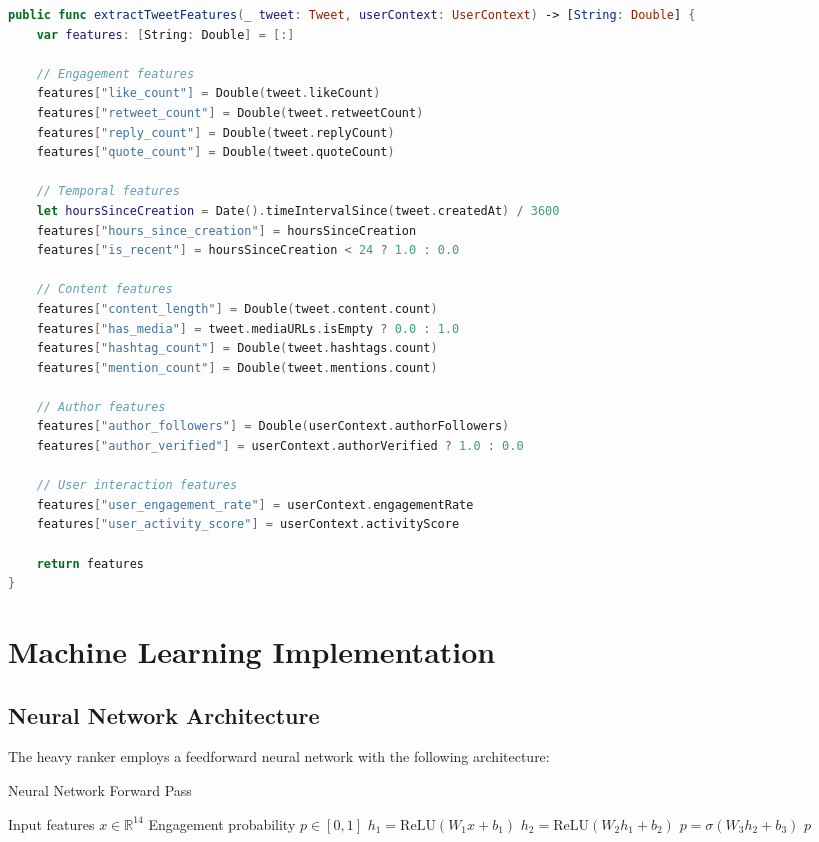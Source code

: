 \documentclass[11pt,a4paper]{article}
\begin{document}
\begin{lstlisting}[language=Swift, caption=Feature Extraction Implementation]
public func extractTweetFeatures(_ tweet: Tweet, userContext: UserContext) -> [String: Double] {
    var features: [String: Double] = [:]
    
    // Engagement features
    features["like_count"] = Double(tweet.likeCount)
    features["retweet_count"] = Double(tweet.retweetCount)
    features["reply_count"] = Double(tweet.replyCount)
    features["quote_count"] = Double(tweet.quoteCount)
    
    // Temporal features
    let hoursSinceCreation = Date().timeIntervalSince(tweet.createdAt) / 3600
    features["hours_since_creation"] = hoursSinceCreation
    features["is_recent"] = hoursSinceCreation < 24 ? 1.0 : 0.0
    
    // Content features
    features["content_length"] = Double(tweet.content.count)
    features["has_media"] = tweet.mediaURLs.isEmpty ? 0.0 : 1.0
    features["hashtag_count"] = Double(tweet.hashtags.count)
    features["mention_count"] = Double(tweet.mentions.count)
    
    // Author features
    features["author_followers"] = Double(userContext.authorFollowers)
    features["author_verified"] = userContext.authorVerified ? 1.0 : 0.0
    
    // User interaction features
    features["user_engagement_rate"] = userContext.engagementRate
    features["user_activity_score"] = userContext.activityScore
    
    return features
}
\end{lstlisting}

\section{Machine Learning Implementation}

\subsection{Neural Network Architecture}

The heavy ranker employs a feedforward neural network with the following architecture:

\begin{algorithm}[H]
\caption{Neural Network Forward Pass}
\begin{algorithmic}[1]
\REQUIRE Input features $x \in \mathbb{R}^{14}$
\ENSURE Engagement probability $p \in [0,1]$
\STATE $h_1 = \text{ReLU}(W_1 x + b_1)$ 
\STATE $h_2 = \text{ReLU}(W_2 h_1 + b_2)$ 
\STATE $p = \sigma(W_3 h_2 + b_3)$ 
\RETURN $p$
\end{algorithmic}
\end{algorithm}
\end{document}
